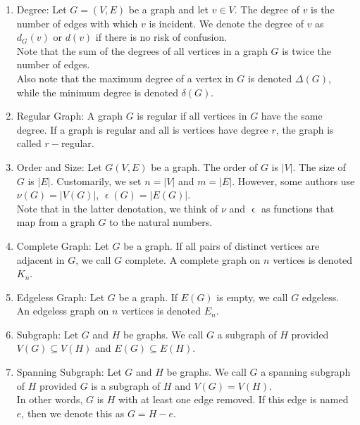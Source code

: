 \documentclass{article}
\begin{document}
\begin{enumerate}
    \item Degree: Let $G=(V,E)$ be a graph and let $v\in V$.
    The degree of $v$ is the number of edges with which $v$ is incident.
    We denote the degree of $v$ as $d_G(v)$ or $d(v)$ if there is no risk of confusion.\\

    Note that the sum of the degrees of all vertices in a graph $G$ is twice the number of edges.\\

    Also note that the maximum degree of a vertex in $G$ is denoted $\Delta(G)$, while the minimum degree is denoted $\delta(G)$.

    \item Regular Graph: A graph $G$ is regular if all vertices in $G$ have the same degree.
    If a graph is regular and all is vertices have degree $r$, the graph is called $r-$regular.

    \item Order and Size: Let $G(V,E)$ be a graph.
    The order of $G$ is $|V|$.
    The size of $G$ is $|E|$.
    Customarily, we set $n=|V|$ and $m=|E|$.
    However, some authors use $\nu(G)=|V(G)|$, $\upvarepsilon(G)=|E(G)|$.\\

    Note that in the latter denotation, we think of $\nu$ and $\upvarepsilon$ as functions that map from a graph $G$ to the natural numbers.

    \item Complete Graph: Let $G$ be a graph.
    If all pairs of distinct vertices are adjacent in $G$, we call $G$ complete.
    A complete graph on $n$ vertices is denoted $K_n$.

    \item Edgeless Graph: Let $G$ be a graph.
    If $E(G)$ is empty, we call $G$ edgeless.
    An edgeless graph on $n$ vertices is denoted $E_n$.

    \item Subgraph: Let $G$ and $H$ be graphs.
    We call $G$ a subgraph of $H$ provided $V(G)\subseteq V(H)$ and $E(G)\subseteq E(H)$.

    \item Spanning Subgraph: Let $G$ and $H$ be graphs.
    We call $G$ a spanning subgraph of $H$ provided $G$ is a subgraph of $H$ and $V(G)=V(H)$.\\

    In other words, $G$ is $H$ with at least one edge removed.
    If this edge is named $e$, then we denote this as $G=H-e$.


\end{enumerate}
\end{document}
